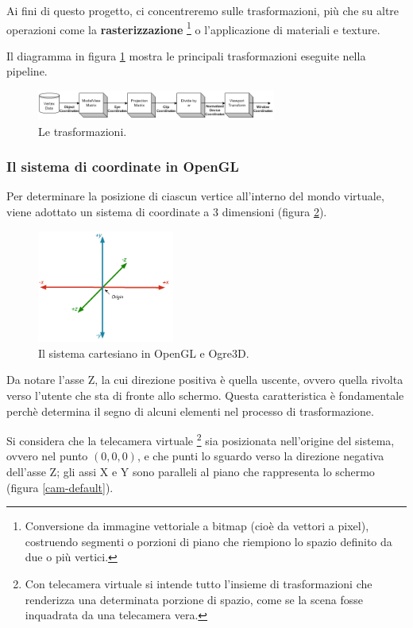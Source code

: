 Ai fini di questo progetto, ci concentreremo sulle trasformazioni, più che su altre operazioni come la \textbf{rasterizzazione} \footnote{Conversione da immagine vettoriale a bitmap (cioè da vettori a pixel), costruendo segmenti o porzioni di piano che riempiono lo spazio definito da due o più vertici.} o l'applicazione di materiali e texture.


Il diagramma in figura \ref{trans-pipe} mostra le principali trasformazioni eseguite nella pipeline.

\begin{figure}[htbp]
\centering
\includegraphics[width=0.7\textwidth]{images/frustum/transform-pipeline.png}
\caption{Le trasformazioni.\label{trans-pipe}}
\end{figure}

\subsubsection{Il sistema di coordinate in OpenGL}
Per determinare la posizione di ciascun vertice all'interno del mondo virtuale, viene adottato un sistema di coordinate a 3 dimensioni (figura \ref{cartesian}).
\begin{figure}[htbp]
\centering
\includegraphics[width=0.4\textwidth]{images/frustum/cartesian.png}
\caption{Il sistema cartesiano in OpenGL e Ogre3D.\label{cartesian}}
\end{figure}
Da notare l'asse Z, la cui direzione positiva è quella uscente, ovvero quella rivolta verso l'utente che sta di fronte allo schermo. Questa caratteristica è fondamentale perchè determina il segno di alcuni elementi nel processo di trasformazione. 

Si considera che la telecamera virtuale \footnote{Con telecamera virtuale si intende tutto l'insieme di trasformazioni che renderizza una determinata porzione di spazio, come se la scena fosse inquadrata da una telecamera vera.} sia posizionata nell'origine del sistema, ovvero nel punto $(0,0,0)$, e che punti lo sguardo verso la direzione negativa dell'asse Z; gli assi X e Y sono paralleli al piano che rappresenta lo schermo (figura \ref{cam-default}).

